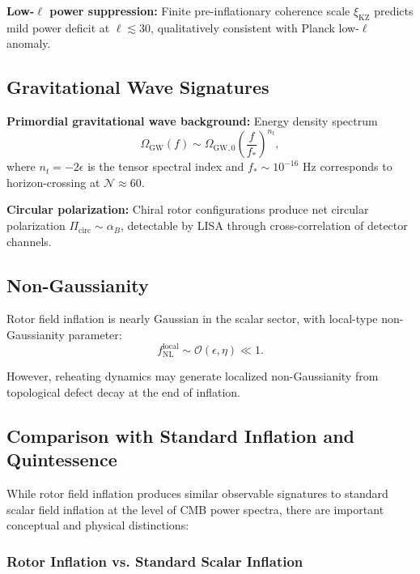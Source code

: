 \documentclass[11pt,a4paper]{article}
\numberwithin{equation}{section}
\theoremstyle{plain}
\theoremstyle{definition}
\theoremstyle{remark}
\begin{document}
\textbf{Low-$\ell$ power suppression:} Finite pre-inflationary coherence scale $\xi_{\mathrm{KZ}}$ predicts mild power deficit at $\ell \lesssim 30$, qualitatively consistent with Planck low-$\ell$ anomaly.

\subsection{Gravitational Wave Signatures}

\textbf{Primordial gravitational wave background:} Energy density spectrum
\begin{equation}
\Omega_{\mathrm{GW}}(f) \sim \Omega_{\mathrm{GW},0}\left(\frac{f}{f_*}\right)^{n_t},
\end{equation}
where $n_t = -2\epsilon$ is the tensor spectral index and $f_* \sim 10^{-16}$ Hz corresponds to horizon-crossing at $\mathcal{N} \approx 60$.

\textbf{Circular polarization:} Chiral rotor configurations produce net circular polarization $\Pi_{\mathrm{circ}} \sim \alpha_B$, detectable by LISA through cross-correlation of detector channels.

\subsection{Non-Gaussianity}

Rotor field inflation is nearly Gaussian in the scalar sector, with local-type non-Gaussianity parameter:
\begin{equation}
f_{\mathrm{NL}}^{\mathrm{local}} \sim \mathcal{O}(\epsilon, \eta) \ll 1.
\end{equation}

However, reheating dynamics may generate localized non-Gaussianity from topological defect decay at the end of inflation.

\subsection{Comparison with Standard Inflation and Quintessence}
\label{sec:comparison}

While rotor field inflation produces similar observable signatures to standard scalar field inflation at the level of CMB power spectra, there are important conceptual and physical distinctions:

\subsubsection{Rotor Inflation vs. Standard Scalar Inflation}
\end{document}
